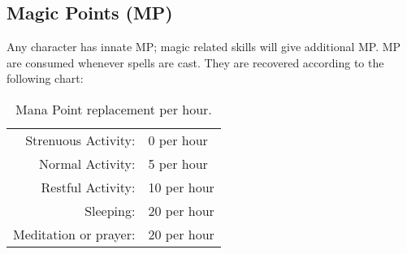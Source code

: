 \documentclass[twoside]{book}
\begin{document}
\subsection{Magic Points (MP)}
      Any character has innate MP; magic related skills
               will give additional MP.   MP are consumed whenever spells are cast. They are
               recovered according to the following chart: 
\begin{table}[htb]
  \begin{center}

  \begin{tabular}{|r|l|}
  \hline
    
  \textscbf{}&
  \textscbf{}\\
  \hline
  \hline
       Strenuous Activity: & 0 per hour \\

\hline

 Normal Activity: & 5 per hour \\

\hline

 Restful Activity: & 10 per hour \\

\hline

 Sleeping: & 20 per hour \\

\hline

 Meditation or prayer: & 20 per hour \\

\hline


  \end{tabular}
  
\caption{Mana Point replacement per hour.}
  
  \end{center}
\end{table}
  
    
\end{document}
